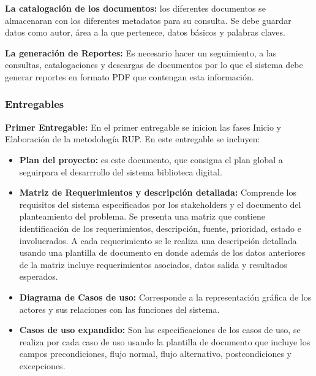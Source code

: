 \documentclass[11pt]{article}
\begin{document}
        \textbf{La catalogación de los documentos:} los diferentes documentos se almacenaran con 
        los diferentes metadatos para su consulta. Se debe guardar datos como autor, área a la que 
        pertenece, datos básicos y palabras claves.
        
        \textbf{La generación de Reportes:} Es necesario hacer un seguimiento, a las consultas,
        catalogaciones y descargas de documentos por lo que el sistema debe generar reportes en 
        formato PDF que contengan esta información.
        
                \subsubsection{Entregables}
                \textbf{Primer Entregable:} En el primer entregable se inicion las fases Inicio y
                Elaboración de la metodología RUP. En este entregable se incluyen:
                
                \begin{itemize}
                \item\textbf{Plan del proyecto:} es este documento, que consigna el plan global a
                seguirpara el desarrrollo del sistema biblioteca digital.
                \item\textbf{Matriz de Requerimientos y descripción detallada:} Comprende los
                requisitos del sistema especificados por los stakeholders y el documento del
                planteamiento del problema.
                Se presenta una matriz que contiene identificación de los requerimientos,
                descripción, fuente, prioridad, estado e involucrados. A cada requerimiento se le
                realiza una descripción detallada usando una plantilla de documento en donde además
                de los datos anteriores de la matriz incluye requerimientos asociados, datos salida
                y resultados esperados.
                \item\textbf{Diagrama de Casos de uso:} Corresponde a la representación gráfica de
                los actores y sus relaciones con las funciones del sistema.
                \item\textbf{Casos de uso expandido:} Son las especificaciones de los casos de uso,
                se realiza por cada caso de uso usando la plantilla de documento que incluye los
                campos precondiciones, flujo normal, flujo alternativo, postcondiciones y 
                excepciones.
                \end{itemize}
                
\end{document}
